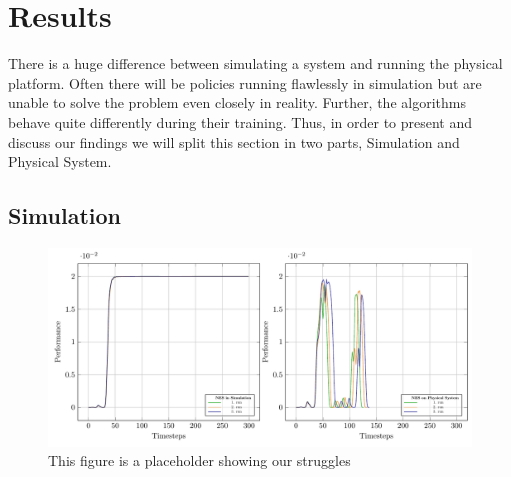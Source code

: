 \section{Results}
\label{results}
There is a huge difference between simulating a system and running the physical platform. Often there will be policies running flawlessly in simulation but are unable to solve the problem even closely in reality. Further, the algorithms behave quite differently during their training. Thus, in order to present and discuss our findings we will split this section in two parts, Simulation and Physical System.

\subsection{Simulation}
\label{sim}

\begin{figure}
\centering
\includegraphics[scale=.6]{plots/benchmark_Qube_NES_plattforms_working.pdf}
\caption{This figure is a placeholder showing our struggles}
\label{fig:NPG_training}
\end{figure}

